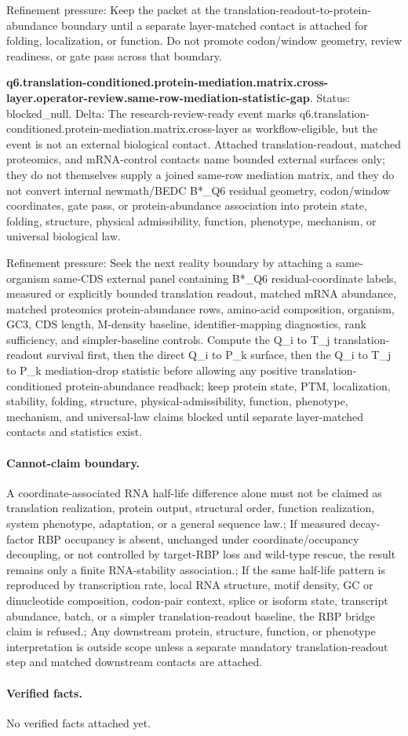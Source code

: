 Refinement pressure: Keep the packet at the translation-readout-to-protein-abundance boundary until a separate layer-matched contact is attached for folding, localization, or function. Do not promote codon/window geometry, review readiness, or gate pass across that boundary.

\textbf{q6.translation-conditioned.protein-mediation.matrix.cross-layer.operator-review.same-row-mediation-statistic-gap}. Status: blocked\_null. Delta: The research-review-ready event marks q6.translation-conditioned.protein-mediation.matrix.cross-layer as workflow-eligible, but the event is not an external biological contact. Attached translation-readout, matched proteomics, and mRNA-control contacts name bounded external surfaces only; they do not themselves supply a joined same-row mediation matrix, and they do not convert internal newmath/BEDC B*\_Q6 residual geometry, codon/window coordinates, gate pass, or protein-abundance association into protein state, folding, structure, physical admissibility, function, phenotype, mechanism, or universal biological law.

Refinement pressure: Seek the next reality boundary by attaching a same-organism same-CDS external panel containing B*\_Q6 residual-coordinate labels, measured or explicitly bounded translation readout, matched mRNA abundance, matched proteomics protein-abundance rows, amino-acid composition, organism, GC3, CDS length, M-density baseline, identifier-mapping diagnostics, rank sufficiency, and simpler-baseline controls. Compute the Q\_i to T\_j translation-readout survival first, then the direct Q\_i to P\_k surface, then the Q\_i to T\_j to P\_k mediation-drop statistic before allowing any positive translation-conditioned protein-abundance readback; keep protein state, PTM, localization, stability, folding, structure, physical-admissibility, function, phenotype, mechanism, and universal-law claims blocked until separate layer-matched contacts and statistics exist.

\paragraph{Cannot-claim boundary.} A coordinate-associated RNA half-life difference alone must not be claimed as translation realization, protein output, structural order, function realization, system phenotype, adaptation, or a general sequence law.; If measured decay-factor RBP occupancy is absent, unchanged under coordinate/occupancy decoupling, or not controlled by target-RBP loss and wild-type rescue, the result remains only a finite RNA-stability association.; If the same half-life pattern is reproduced by transcription rate, local RNA structure, motif density, GC or dinucleotide composition, codon-pair context, splice or isoform state, transcript abundance, batch, or a simpler translation-readout baseline, the RBP bridge claim is refused.; Any downstream protein, structure, function, or phenotype interpretation is outside scope unless a separate mandatory translation-readout step and matched downstream contacts are attached.

\paragraph{Verified facts.}
No verified facts attached yet.
